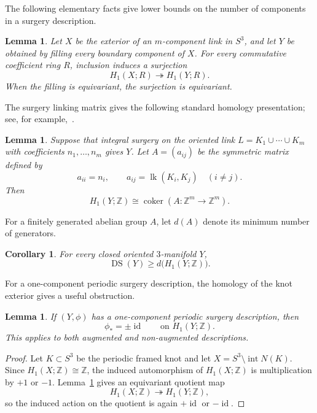 \documentclass[11pt]{amsart}
\newcommand{\DS}{\operatorname{DS}}
\newcommand{\id}{\operatorname{id}}
\newcommand{\Int}{\operatorname{int}}
\newcommand{\coker}{\operatorname{coker}}
\newcommand{\lk}{\operatorname{lk}}
\newcommand{\Z}{\mathbb{Z}}
\newtheorem{lemma}[theorem]{Lemma}
\newtheorem{corollary}[theorem]{Corollary}
\theoremstyle{definition}
\theoremstyle{remark}
\begin{document}
The following elementary facts give lower bounds on the number of components in a surgery description.

\begin{lemma}\label{lem:filling}
Let $X$ be the exterior of an $m$-component link in $S^3$, and let $Y$ be obtained by filling every boundary component of $X$. For every commutative coefficient ring $R$, inclusion induces a surjection
\[
   H_1(X;R)\twoheadrightarrow H_1(Y;R).
\]
When the filling is equivariant, the surjection is equivariant.
\end{lemma}


The surgery linking matrix gives the following standard homology presentation; see, for example,~\cite[Lecture~2]{Saveliev}.

\begin{lemma}\label{lem:matrix}
Suppose that integral surgery on the oriented link $L=K_1\cup\cdots\cup K_m$ with coefficients $n_1,\dots,n_m$ gives $Y$. Let $A=(a_{ij})$ be the symmetric matrix defined by
\[
   a_{ii}=n_i,
   \qquad
   a_{ij}=\lk(K_i,K_j)\quad(i\neq j).
\]
Then
\[
   H_1(Y;\Z)\cong \coker(A\colon\Z^m\to\Z^m).
\]
\end{lemma}


For a finitely generated abelian group $A$, let $d(A)$ denote its minimum number of generators.

\begin{corollary}\label{cor:ordinary-bound}
For every closed oriented $3$-manifold $Y$,
\[
   \DS(Y)\geq d\bigl(H_1(Y;\Z)\bigr).
\]
\end{corollary}


For a one-component periodic surgery description, the homology of the knot exterior gives a useful obstruction.

\begin{lemma}\label{lem:one-component}
If $(Y,\phi)$ has a one-component periodic surgery description, then
\[
   \phi_*=\pm\id
   \qquad\text{on }H_1(Y;\Z).
\]
This applies to both augmented and non-augmented descriptions.
\end{lemma}

\begin{proof}
Let $K\subset S^3$ be the periodic framed knot and let $X=S^3\setminus\Int N(K)$. Since $H_1(X;\Z)\cong\Z$, the induced automorphism of $H_1(X;\Z)$ is multiplication by $+1$ or $-1$. Lemma~\ref{lem:filling} gives an equivariant quotient map
\[
   H_1(X;\Z)\twoheadrightarrow H_1(Y;\Z),
\]
so the induced action on the quotient is again $+\id$ or $-\id$.
\end{proof}
\end{document}
